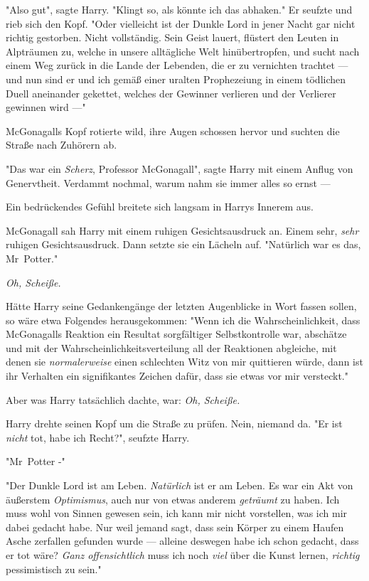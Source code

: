 {"Also gut", sagte Harry. "Klingt so, als könnte ich das abhaken." Er seufzte und rieb sich den Kopf. "Oder vielleicht ist der Dunkle Lord in jener Nacht gar nicht richtig gestorben. Nicht vollständig. Sein Geist lauert, flüstert den Leuten in Alpträumen zu, welche in unsere alltägliche Welt hinübertropfen, und sucht nach einem Weg zurück in die Lande der Lebenden, die er zu vernichten trachtet --- und nun sind er und ich gemäß einer uralten Prophezeiung in einem tödlichen Duell aneinander gekettet, welches der Gewinner verlieren und der Verlierer gewinnen wird ---"

McGonagalls Kopf rotierte wild, ihre Augen schossen hervor und suchten die Straße nach Zuhörern ab.

"Das war ein \emph{Scherz}, Professor McGonagall", sagte Harry mit einem Anflug von Genervtheit. Verdammt nochmal, warum nahm sie immer alles so ernst ---

Ein bedrückendes Gefühl breitete sich langsam in Harrys Innerem aus.

McGonagall sah Harry mit einem ruhigen Gesichtsausdruck an. Einem sehr, \emph{sehr} ruhigen Gesichtsausdruck. Dann setzte sie ein Lächeln auf. "Natürlich war es das, Mr~Potter."

\emph{Oh, Scheiße.}

Hätte Harry seine Gedankengänge der letzten Augenblicke in Wort fassen sollen, so wäre etwa Folgendes herausgekommen: "Wenn ich die Wahrscheinlichkeit, dass McGonagalls Reaktion ein Resultat sorgfältiger Selbstkontrolle war, abschätze und mit der Wahrscheinlichkeitsverteilung all der Reaktionen abgleiche, mit denen sie \emph{normalerweise} einen schlechten Witz von mir quittieren würde, dann ist ihr Verhalten ein signifikantes Zeichen dafür, dass sie etwas vor mir versteckt."

Aber was Harry tatsächlich dachte, war: \emph{Oh, Scheiße.}

Harry drehte seinen Kopf um die Straße zu prüfen. Nein, niemand da. "Er ist \emph{nicht} tot, habe ich Recht?", seufzte Harry.

"Mr~Potter -"

"Der Dunkle Lord ist am Leben. \emph{Natürlich} ist er am Leben. Es war ein Akt von äußerstem \emph{Optimismus}, auch nur von etwas anderem \emph{geträumt} zu haben. Ich muss wohl von Sinnen gewesen sein, ich kann mir nicht vorstellen, was ich mir dabei gedacht habe. Nur weil jemand sagt, dass sein Körper zu einem Haufen Asche zerfallen gefunden wurde --- alleine deswegen habe ich schon gedacht, dass er tot wäre? \emph{Ganz offensichtlich} muss ich noch \emph{viel} über die Kunst lernen, \emph{richtig} pessimistisch zu sein."

}
